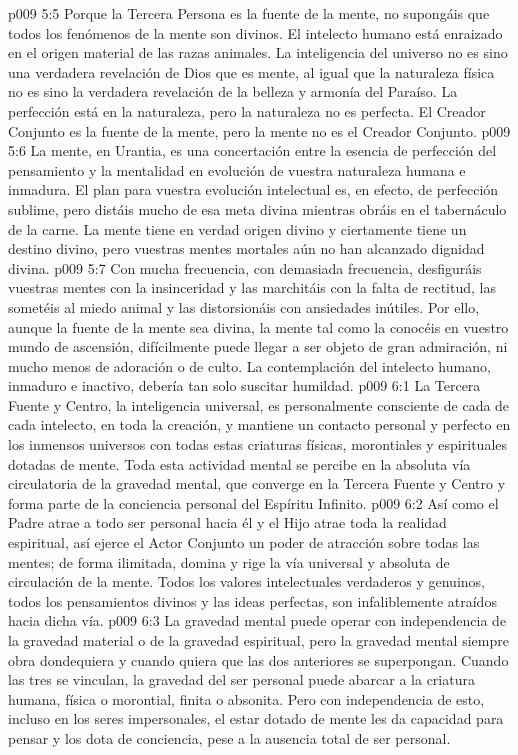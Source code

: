\vs p009 5:5 \pc Porque la Tercera Persona es la fuente de la mente, no supongáis que todos los fenómenos de la mente son divinos. El intelecto humano está enraizado en el origen material de las razas animales. La inteligencia del universo no es sino una verdadera revelación de Dios que es mente, al igual que la naturaleza física no es sino la verdadera revelación de la belleza y armonía del Paraíso. La perfección está en la naturaleza, pero la naturaleza no es perfecta. El Creador Conjunto es la fuente de la mente, pero la mente no es el Creador Conjunto.
\vs p009 5:6 La mente, en Urantia, es una concertación entre la esencia de perfección del pensamiento y la mentalidad en evolución de vuestra naturaleza humana e inmadura. El plan para vuestra evolución intelectual es, en efecto, de perfección sublime, pero distáis mucho de esa meta divina mientras obráis en el tabernáculo de la carne. La mente tiene en verdad origen divino y ciertamente tiene un destino divino, pero vuestras mentes mortales aún no han alcanzado dignidad divina.
\vs p009 5:7 Con mucha frecuencia, con demasiada frecuencia, desfiguráis vuestras mentes con la insinceridad y las marchitáis con la falta de rectitud, las sometéis al miedo animal y las distorsionáis con ansiedades inútiles. Por ello, aunque la fuente de la mente sea divina, la mente tal como la conocéis en vuestro mundo de ascensión, difícilmente puede llegar a ser objeto de gran admiración, ni mucho menos de adoración o de culto. La contemplación del intelecto humano, inmaduro e inactivo, debería tan solo suscitar humildad.
\vs p009 6:1 La Tercera Fuente y Centro, la inteligencia universal, es personalmente consciente de cada  de cada intelecto, en toda la creación, y mantiene un contacto personal y perfecto en los inmensos universos con todas estas criaturas físicas, morontiales y espirituales dotadas de mente. Toda esta actividad mental se percibe en la absoluta vía circulatoria de la gravedad mental, que converge en la Tercera Fuente y Centro y forma parte de la conciencia personal del Espíritu Infinito.
\vs p009 6:2 Así como el Padre atrae a todo ser personal hacia él y el Hijo atrae toda la realidad espiritual, así ejerce el Actor Conjunto un poder de atracción sobre todas las mentes; de forma ilimitada, domina y rige la vía universal y absoluta de circulación de la mente. Todos los valores intelectuales verdaderos y genuinos, todos los pensamientos divinos y las ideas perfectas, son infaliblemente atraídos hacia dicha vía.
\vs p009 6:3 \pc La gravedad mental puede operar con independencia de la gravedad material o de la gravedad espiritual, pero la gravedad mental siempre obra dondequiera y cuando quiera que las dos anteriores se superpongan. Cuando las tres se vinculan, la gravedad del ser personal puede abarcar a la criatura humana, física o morontial, finita o absonita. Pero con independencia de esto, incluso en los seres impersonales, el estar dotado de mente les da capacidad para pensar y los dota de conciencia, pese a la ausencia total de ser personal.
